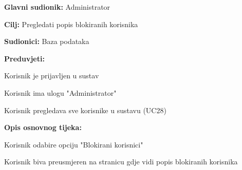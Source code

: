 					\noindent {}
					\begin{packed_item}
	
						\item \textbf{Glavni sudionik: }Administrator
						\item  \textbf{Cilj:} Pregledati popis blokiranih korisnika
						\item  \textbf{Sudionici:} Baza podataka
						\item  \textbf{Preduvjeti:}
						\item[] \begin{packed_enum}
							\item Korisnik je prijavljen u sustav
							\item Korisnik ima ulogu "Administrator"
							\item Korisnik pregledava sve korisnike u sustavu (UC28)
						\end{packed_enum}
						\item  \textbf{Opis osnovnog tijeka:}
						
						\item[] \begin{packed_enum}
	
							\item Korisnik odabire opciju "Blokirani korisnici"
							\item Korisnik biva preusmjeren na stranicu gdje vidi popis blokiranih korisnika
						\end{packed_enum}
					
					\end{packed_item}
					

